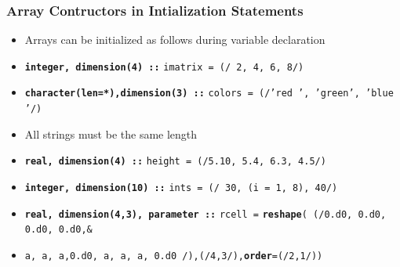 \documentclass[slidestop,mathserif,compress,xcolor=svgnames]{beamer}
\newcommand{\bftt}[1]{\textbf{\texttt{#1}}}
\newenvironment{bblock}[0]
{
\begin{beamerboxesrounded}[upper=uppercol1,lower=lowercol1,shadow=true]}
{\end{beamerboxesrounded}}
\begin{document}
\begin{frame}
  \frametitle{\small Array Contructors in Intialization Statements}
  \begin{itemize}
    \item Arrays can be initialized as follows during variable declaration
  \end{itemize}
  \begin{bblock}{}
    {\tiny
      \begin{itemize}
        \item[] \textbf{\texttt{integer, dimension(4) ::}} \texttt{imatrix = (/ 2, 4, 6, 8/)}
        \item[] \textbf{\texttt{character(len=*),dimension(3) ::}} \texttt{colors = (/'red  ', 'green', 'blue '/)}
        \item[] {\color{red}All strings must be the same length}
        \item[] \textbf{\texttt{real, dimension(4) ::}} \texttt{height = (/5.10, 5.4, 6.3, 4.5/)}
        \item[] \textbf{\texttt{integer, dimension(10) ::}} \texttt{ints = (/ 30, (i = 1, 8), 40/)}
        \item[] \textbf{\texttt{real, dimension(4,3), parameter ::}}   \texttt{rcell =} \bftt{reshape}\texttt{( (/0.d0, 0.d0, 0.d0, 0.d0,\&}
        \item[] \texttt{\quad\quad a, a, a,0.d0, a, a, a, 0.d0 /),(/4,3/),}\bftt{order}\texttt{=(/2,1/)) }
      \end{itemize}
    }
  \end{bblock}
\end{frame}
\end{document}
